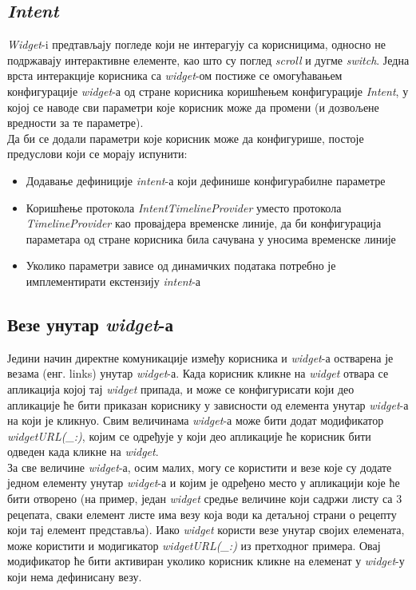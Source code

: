 \documentclass[12pt,oneside]{memoir}
\begin{document}
\subsection{\textit{Intent}}
\label{subsec:Intent}
\indent \textit{Widget}-i предтављају погледе који не интерагују са корисницима, односно не подржавају интерактивне елементе, као што су поглед \textit{scroll} и дугме \textit{switch}. Једна врста интеракције корисника са \textit{widget}-ом постиже се омогућавањем конфигурације \textit{widget}-а од стране корисника коришћењем конфигурације \textit{Intent}, у којој се наводе сви параметри које корисник може да промени (и дозвољене вредности за те параметре). 
\\
\indent Да би се додали параметри које корисник може да конфигурише, постоје предуслови који се морају испунити:
\begin{itemize}
    \item Додавање дефиниције \textit{intent}-а који дефинише конфигурабилне параметре 
    \item Коришћење протокола \textit{IntentTimelineProvider} уместо протокола \textit{TimelineProvider} као провајдера временске линије, да би конфигурација параметара од стране корисника била сачувана у уносима временске линије
    \item Уколико параметри зависе од динамичких података потребно је имплементирати екстензију \textit{intent}-а
\end{itemize}

\subsection{Везе унутар \textit{widget}-а}
\indent Једини начин директне комуникације између корисника и \textit{widget}-а остварена је везама (енг. links) унутар \textit{widget}-а. Када корисник кликне на \textit{widget} отвара се апликација којој тај \textit{widget} припада, и може се конфигурисати који део апликације ће бити приказан кориснику у зависности од елемента унутар \textit{widget}-а на који је кликнуо. Свим величинама \textit{widget}-а може бити додат модификатор \textit{widgetURL(\_:)}, којим се одређује у који део апликације ће корисник бити одведен када кликне на \textit{widget}.
\\
\indent За све величине \textit{widget}-а, осим малих, могу се користити и везе које су додате једном елементу унутар \textit{widget}-а и којим је одређено место у апликацији које ће бити отворено (на пример, један \textit{widget} средње величине који садржи листу са 3 рецепата, сваки елемент листе има везу која води ка детаљној страни о рецепту који тај елемент представља). Иако \textit{widget} користи везе унутар својих елемената, може користити и модигикатор \textit{widgetURL(\_:)} из претходног примера. Овај модификатор ће бити активиран уколико корисник кликне на елеменат у \textit{widget}-у који нема дефинисану везу. 
\end{document}
